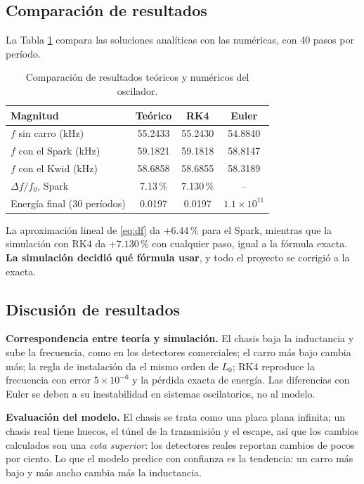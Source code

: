 \documentclass[10pt,onecolumn]{article}
\numberwithin{equation}{section}
\numberwithin{figure}{section}
\numberwithin{table}{section}
\begin{document}
\subsection{Comparación de resultados}

La Tabla \ref{tab:comparacion} compara las soluciones analíticas con las numéricas, con 40 pasos por período.

\begin{table}[H]
    \centering
    \caption{Comparación de resultados teóricos y numéricos del oscilador.}
    \label{tab:comparacion}
    \small
    \begin{tabular}{lccc}
        \toprule
        Magnitud & Teórico & RK4 & Euler \\
        \midrule
        $f$ sin carro (kHz) & 55.2433 & 55.2430 & 54.8840 \\
        $f$ con el Spark (kHz) & 59.1821 & 59.1818 & 58.8147 \\
        $f$ con el Kwid (kHz) & 58.6858 & 58.6855 & 58.3189 \\
        $\Delta f/f_0$, Spark & 7.13\,\% & 7.130\,\% & -- \\
        Energía final (30 períodos) & 0.0197 & 0.0197 & $1.1\times10^{11}$ \\
        \bottomrule
    \end{tabular}
\end{table}

La aproximación lineal de \eqref{eq:df} da $+6.44$\,\% para el Spark, mientras que la simulación con RK4 da
$+7.130$\,\% con cualquier paso, igual a la fórmula exacta. \textbf{La simulación decidió qué fórmula usar}, y todo el
proyecto se corrigió a la exacta.

\subsection{Discusión de resultados}

\textbf{Correspondencia entre teoría y simulación.} El chasis baja la inductancia y sube la frecuencia, como en los
detectores comerciales; el carro más bajo cambia más; la regla de instalación da el mismo orden de $L_0$; RK4
reproduce la frecuencia con error $5\times10^{-6}$ y la pérdida exacta de energía. Las diferencias con Euler se deben
a su inestabilidad en sistemas oscilatorios, no al modelo.

\textbf{Evaluación del modelo.} El chasis se trata como una placa plana infinita; un chasis real tiene huecos, el
túnel de la transmisión y el escape, así que los cambios calculados son una \emph{cota superior}: los detectores
reales reportan cambios de pocos por ciento. Lo que el modelo predice con confianza es la tendencia: un carro más
bajo y más ancho cambia más la inductancia.
\end{document}
